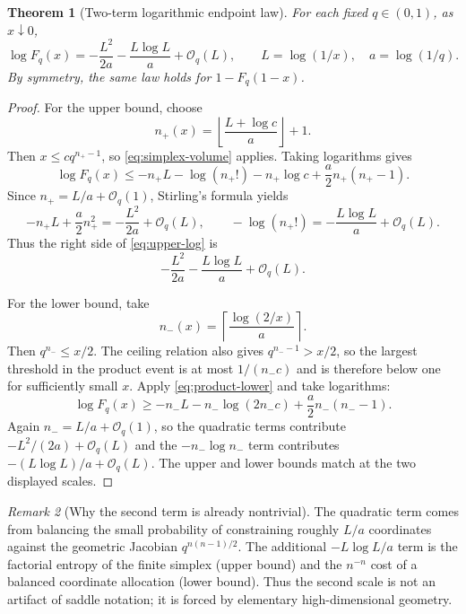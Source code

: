 \documentclass[11pt,oneside]{article}
\newtheorem{theorem}{Theorem}[section]
\theoremstyle{definition}
\theoremstyle{remark}
\newtheorem{remark}[theorem]{Remark}
\newcommand{\bigO}{\mathcal O}
\begin{document}
\begin{theorem}[Two-term logarithmic endpoint law]
\label{thm:endpoint}
For each fixed $q\in(0,1)$, as $x\downarrow0$,
\begin{equation}
 \boxed{\displaystyle
 \log F_q(x)
 =-\frac{L^2}{2a}-\frac{L\log L}{a}+\bigO_q(L),
 \qquad L=\log(1/x),\quad a=\log(1/q).}                     \label{eq:endpoint-main}
\end{equation}
By symmetry, the same law holds for $1-F_q(1-x)$.
\end{theorem}

\begin{proof}
For the upper bound, choose
\[
 n_+(x)=\left\lfloor\frac{L+\log c}{a}\right\rfloor+1.
\]
Then $x\le cq^{n_+-1}$, so \eqref{eq:simplex-volume} applies.  Taking logarithms gives
\begin{equation}
 \log F_q(x)
 \le-n_+L-\log(n_+!)-n_+\log c+\frac{a}{2}n_+(n_+-1).       \label{eq:upper-log}
\end{equation}
Since $n_+=L/a+\bigO_q(1)$, Stirling's formula yields
\[
 -n_+L+\frac{a}{2}n_+^2=-\frac{L^2}{2a}+\bigO_q(L),
 \qquad
 -\log(n_+!)=-\frac{L\log L}{a}+\bigO_q(L).
\]
Thus the right side of \eqref{eq:upper-log} is
\[
 -\frac{L^2}{2a}-\frac{L\log L}{a}+\bigO_q(L).
\]

For the lower bound, take
\[
 n_-(x)=\left\lceil\frac{\log(2/x)}{a}\right\rceil.
\]
Then $q^{n_-}\le x/2$.  The ceiling relation also gives
$q^{n_--1}>x/2$, so the largest threshold in the product event is at most
$1/(n_-c)$ and is therefore below one for sufficiently small $x$.  Apply
\eqref{eq:product-lower} and take logarithms:
\begin{equation}
 \log F_q(x)
 \ge-n_-L-n_-\log(2n_-c)+\frac{a}{2}n_-(n_--1).             \label{eq:lower-log}
\end{equation}
Again $n_-=L/a+\bigO_q(1)$, so the quadratic terms contribute
$-L^2/(2a)+\bigO_q(L)$ and the $-n_-\log n_-$ term contributes
$-(L\log L)/a+\bigO_q(L)$.  The upper and lower bounds match at the two displayed scales.
\end{proof}

\begin{remark}[Why the second term is already nontrivial]
The quadratic term comes from balancing the small probability of constraining roughly
$L/a$ coordinates against the geometric Jacobian $q^{n(n-1)/2}$.  The additional
$-L\log L/a$ term is the factorial entropy of the finite simplex (upper bound) and the
$n^{-n}$ cost of a balanced coordinate allocation (lower bound).  Thus the second scale is
not an artifact of saddle notation; it is forced by elementary high-dimensional geometry.
\end{remark}
\end{document}
